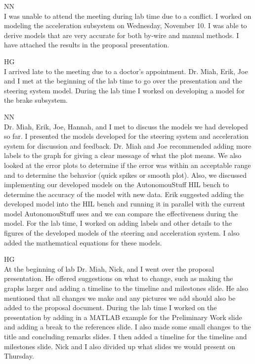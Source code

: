 \documentclass[fontsize=11pt, %
                             paper=letter, %
                             openany, %
                             captions=tableheading,
                             index=totoc,
                             hyperref]{labbook}
\def\currentYear{2021}
\begin{document}
\begin{addmargin}[0cm]{0cm}
NN\\
I was unable to attend the meeting during lab time due to a conflict. I worked on modeling the acceleration subsystem on Wednesday, November 10. I was able to derive models that are very accurate for both by-wire and manual methods. I have attached the results in the proposal presentation.

\labday{Thursday, November 11, \currentYear}
HG\\
I arrived late to the meeting due to a doctor's appointment. Dr. Miah, Erik, Joe and I met at the beginning of the lab time to go over the presentation and the steering system model. During the lab time I worked on developing a model for the brake subsystem.  

NN\\
Dr. Miah, Erik, Joe, Hannah, and I met to discuss the models we had developed so far. I presented the models developed for the steering system and acceleration system for discussion and feedback. Dr. Miah and Joe recommended adding more labels to the graph for giving a clear message of what the plot means. We also looked at the error plots to determine if the error was within an acceptable range and to determine the behavior (quick spikes or smooth plot). Also, we discussed implementing our developed models on the AutonomouStuff HIL bench to determine the accuracy of the model with new data. Erik suggested adding the developed model into the HIL bench and running it in parallel with the current model AutonomouStuff uses and we can compare the effectiveness during the model. For the lab time, I worked on adding labels and other details to the figures of the developed models of the steering and acceleration system. I also added the mathematical equations for these models.


\labday{Tuesday, November 16, \currentYear}
HG\\
At the beginning of lab Dr. Miah, Nick, and I went over the proposal presentation. He offered suggestions on what to change, such as making the graphs larger and adding a timeline to the timeline and milestones slide. He also mentioned that all changes we make and any pictures we add should also be added to the proposal document. During the lab time I worked on the presentation by adding in a MATLAB example for the Preliminary Work slide and adding a break to the references slide. I also made some small changes to the title and concluding remarks slides. I then added a timeline for the timeline and milestones slide. Nick and I also divided up what slides we would present on Thursday. 


\end{addmargin}
\end{document}
